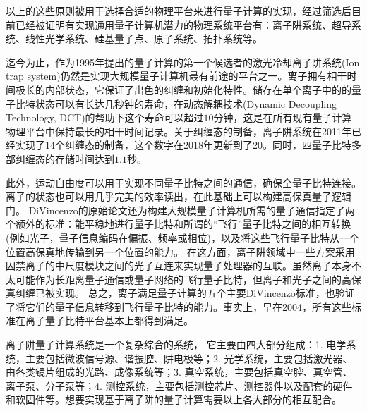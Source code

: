以上的这些原则被用于选择合适的物理平台来进行量子计算的实现，经过筛选后目前已经被证明有实现通用量子计算机潜力的物理系统平台有：离子阱系统、超导系统、线性光学系统、硅基量子点、原子系统、拓扑系统等。

迄今为止，作为1995年提出的量子计算的第一个候选者的激光冷却离子阱系统(Ion trap system)仍然是实现大规模量子计算机最有前途的平台之一。离子拥有相干时间极长\cite[]{Fisk_Sellars_Lawn_Coles_1997}的内部状态，它保证了出色的纠缠和初始化特性\cite[]{Blatt_Wineland_2008}。储存在单个离子中的的量子比特状态可以有长达几秒钟的寿命\cite[]{Langer_Ozeri_Jost_Chiaverini_DeMarco_Ben_Kish_Blakestad_Britton_Hume_Itano_et_al_2005}，在动态解耦技术(Dynamic Decoupling Technology, DCT)的帮助下这个寿命可以超过$10$分钟\cite[]{Wang_Um_Zhang_An_Lyu_Zhang_Duan_Yum_Kim_2017}，这是在所有现有量子计算物理平台中保持最长的相干时间记录。关于纠缠态的制备，离子阱系统在2011年已经实现了$14$个纠缠态的制备\cite[]{Monz_Schindler_Barreiro_Chwalla_Nigg_Coish_Harlander_Hänsel_Hennrich_Blatt_2011}，这个数字在2018年更新到了20\cite[]{Friis_Marty_Maier_Hempel_Holzäpfel_Jurcevic_Plenio_Huber_Roos_Blatt_et_al_2018}。同时，四量子比特多部纠缠态的存储时间达到$1.1$秒\cite[]{Kaufmann_Ruster_Schmiegelow_Luda_Kaushal_Schulz_von_Lindenfels_Schmidt_Kaler_Poschinger_2017}。

此外，运动自由度可以用于实现不同量子比特之间的通信，确保全量子比特连接\cite[]{Debnath_Linke_Figgatt_Landsman_Wright_Monroe_2016}。离子的状态也可以用几乎完美的效率读出\cite[]{Myerson_Szwer_Webster_Allcock_Curtis_Imreh_Sherman_Stacey_Steane_Lucas_2008}，在此基础上可以构建高保真量子逻辑门\cite[]{Ballance_Harty_Linke_Sepiol_Lucas_2016}。
DiVincenzo的原始论文还为构建大规模量子计算机所需的量子通信指定了两个额外的标准：能平稳地进行量子比特和所谓的“飞行”量子比特之间的相互转换(例如光子，量子信息编码在偏振、频率或相位)，以及将这些飞行量子比特从一个位置高保真地传输到另一个位置的能力。
在这方面，离子阱领域中一些方案采用囚禁离子的中尺度模块之间的光子互连来实现量子处理器的互联\cite[]{Monroe_Raussendorf_Ruthven_Brown_Maunz_Duan_Kim_2014}。虽然离子本身不太可能作为长距离量子通信或量子网络的飞行量子比特，但离子和光子之间的高保真纠缠已被实现\cite[]{Moehring_Blinov_Madsen_Duan_Monroe_2004}。
总之，离子满足量子计算的五个主要DiVincenzo标准，也验证了将它们的量子信息转移到飞行量子比特的能力。事实上，早在2004，所有这些标准在离子量子比特平台基本上都得到满足\cite[]{Leibfried_DeMarco_Meyer_Lucas_Barrett_Britton_Itano_Jelenković_Langer_Rosenband_et_al_2003,Moehring_Blinov_Madsen_Duan_Monroe_2004}。

离子阱量子计算系统是一个复杂综合的系统，
它主要由四大部分组成：1.  电学系统，主要包括微波信号源、谐振腔、阱电极等；2. 光学系统，主要包括激光器、由各类镜片组成的光路、成像系统等；3. 真空系统，主要包括真空腔、真空管、离子泵、分子泵等；4. 测控系统，主要包括测控芯片、测控器件以及配套的硬件和软固件等。想要实现基于离子阱的量子计算需要以上各大部分的相互配合。

